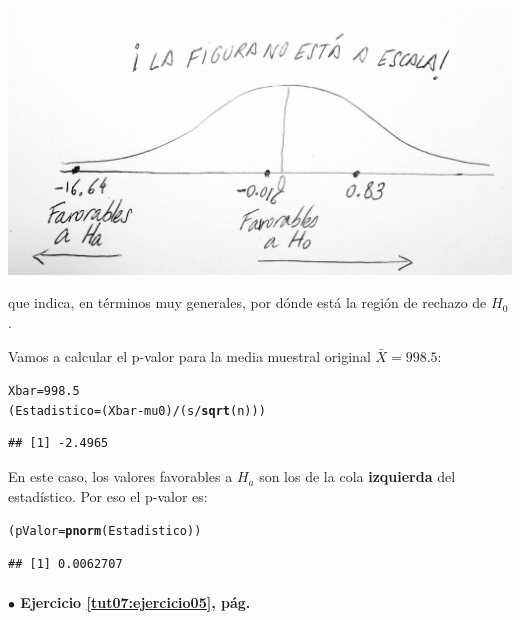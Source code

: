 \documentclass[10pt,a4paper]{article}\usepackage[]{graphicx}\usepackage[]{color}
\makeatletter
\newcommand{\hlnum}[1]{\textcolor[rgb]{0.686,0.059,0.569}{#1}}%
\newcommand{\hlopt}[1]{\textcolor[rgb]{0,0,0}{#1}}%
\newcommand{\hlstd}[1]{\textcolor[rgb]{0.345,0.345,0.345}{#1}}%
\newcommand{\hlkwb}[1]{\textcolor[rgb]{0.69,0.353,0.396}{#1}}%
\newcommand{\hlkwd}[1]{\textcolor[rgb]{0.737,0.353,0.396}{\textbf{#1}}}%
\newenvironment{kframe}{%
 \def\at@end@of@kframe{}%
 \ifinner\ifhmode%
  \def\at@end@of@kframe{\end{minipage}}%
  \begin{minipage}{\columnwidth}%
 \fi\fi%
 \def\FrameCommand##1{\hskip\@totalleftmargin \hskip-\fboxsep
 \colorbox{shadecolor}{##1}\hskip-\fboxsep
     \hskip-\linewidth \hskip-\@totalleftmargin \hskip\columnwidth}%
 \MakeFramed {\advance\hsize-\width
   \@totalleftmargin\z@ \linewidth\hsize
   \@setminipage}}%
 {\par\unskip\endMakeFramed%
 \at@end@of@kframe}
\newenvironment{knitrout}{}{} %
\makeatother
\begin{document}
\begin{center}
    \includegraphics[width=14cm]{../fig/Tut07-14.png}
\end{center}
que indica, en términos muy generales, por dónde está la región de rechazo de $H_0$.

Vamos a calcular el p-valor para la media muestral original $\bar X= 998.5$:
\begin{knitrout}
\color{fgcolor}\begin{kframe}
\begin{alltt}
\hlstd{Xbar} \hlkwb{=} \hlnum{998.5}
\hlstd{(Estadistico} \hlkwb{=} \hlstd{(Xbar} \hlopt{-} \hlstd{mu0)} \hlopt{/} \hlstd{(s} \hlopt{/} \hlkwd{sqrt}\hlstd{(n)))}
\end{alltt}
\begin{verbatim}
## [1] -2.4965
\end{verbatim}
\end{kframe}
\end{knitrout}
En este caso, los valores favorables a $H_a$ son los de la cola {\bf izquierda} del estadístico. Por eso el p-valor es:
\begin{knitrout}
\color{fgcolor}\begin{kframe}
\begin{alltt}
  \hlstd{(pValor} \hlkwb{=} \hlkwd{pnorm}\hlstd{(Estadistico))}
\end{alltt}
\begin{verbatim}
## [1] 0.0062707
\end{verbatim}
\end{kframe}
\end{knitrout}

\paragraph{\bf $\bullet$ Ejercicio \ref{tut07:ejercicio05}, pág. \pageref{tut07:ejercicio05}}
\label{tut07:ejercicio05:sol}\quad\\
\end{document}
